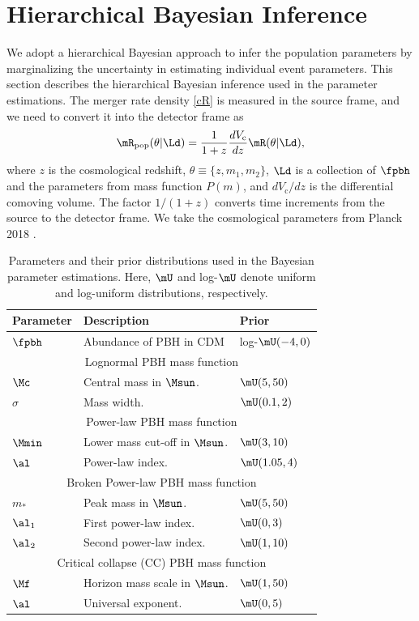 \documentclass[
reprint,           %
superscriptaddress,%
amsmath,           %
amssymb,           %
aps,               %
prd,               %
notitlepage,       %
longbibliography,  %
floatfix,          %
nofootinbib,
]{revtex4-1}
\def\[{\left[}
\def\e{\begin{equation}}
\def\q{\end{equation}}
\begin{document}
\section{\label{method}Hierarchical Bayesian Inference}
We adopt a hierarchical Bayesian approach to infer the population parameters by marginalizing the uncertainty in estimating individual event parameters.
This section describes the hierarchical Bayesian inference used in the parameter estimations.
The merger rate density \eqref{cR} is measured in the source frame, and we need to convert it into the detector frame as
\e\label{Rpop}
\mR_{\mathrm{pop}}(\theta|\Ld) = \frac{1}{1+z} \frac{dV_\mathrm{c}}{dz} \mR(\theta|\Ld),
\q
where $z$ is the cosmological redshift, $\theta\equiv\{z, m_1, m_2\}$, $\Ld$ is a collection of $\fpbh$ and the parameters from mass function $P(m)$, and $dV_\mathrm{c}/dz$ is the differential comoving volume. The factor $1/(1 + z)$ converts time increments from the source to the detector frame. We take the cosmological parameters from Planck 2018 \cite{Planck:2018vyg}.

\begin{table}[tbp!]
	\centering
	\begin{tabular}{lll}
		\hline\hline
		\textbf{Parameter\quad} & \textbf{Description} & \textbf{Prior} \\
		\hline
		$\fpbh$ & Abundance of PBH in CDM & log-$\mU(-4, 0)$\\
		\hline
		\multicolumn{3}{c}{Lognormal PBH mass function} \\[1pt]
		$\Mc$ & Central mass in $\Msun$. & $\mU(5, 50)$\\
		$\sigma$ & Mass width. & $\mU(0.1, 2)$\\
		\hline
		\multicolumn{3}{c}{Power-law PBH mass function} \\[1pt]
		$\Mmin$ & Lower mass cut-off in $\Msun$. & $\mU(3, 10)$\\
		$\al$ & Power-law index. & $\mU(1.05, 4)$\\
		\hline
		\multicolumn{3}{c}{Broken Power-law PBH mass function} \\[1pt]
		$m_*$ & Peak mass in $\Msun$. & $\mU(5, 50)$\\
		$\al_1$ & First power-law index. & $\mU(0, 3)$\\
		$\al_2$ & Second power-law index. & $\mU(1, 10)$\\
		\hline
		\multicolumn{3}{c}{Critical collapse (CC) PBH mass function} \\[1pt]
		$\Mf$ & Horizon mass scale in $\Msun$. & $\mU(1, 50)$\\
		$\al$ & Universal exponent. & $\mU(0, 5)$\\
		\hline
	\end{tabular}	
	\caption{\label{table:priors}Parameters and their prior distributions used in the Bayesian parameter estimations. Here, $\mU$ and log-$\mU$ denote uniform and log-uniform distributions, respectively.}
\end{table}
\end{document}
